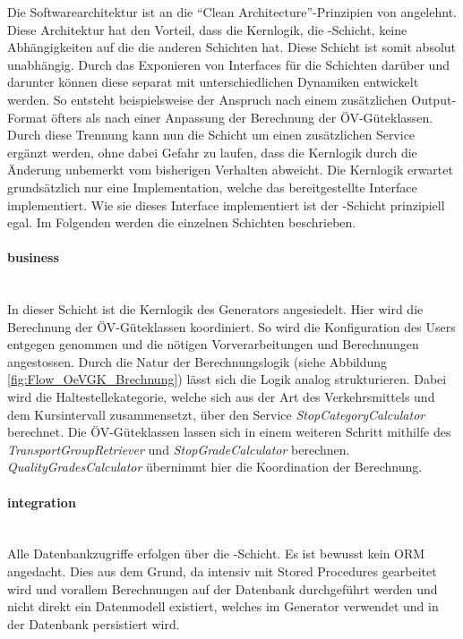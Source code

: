Die Softwarearchitektur ist an die "`Clean Architecture"'-Prinzipien von \cite{martin_clean_architecture} angelehnt.
Diese Architektur hat den Vorteil, dass die Kernlogik, die \emph{}-Schicht, keine Abhängigkeiten auf die die anderen Schichten hat.
Diese Schicht ist somit absolut unabhängig.
Durch das Exponieren von Interfaces für die Schichten darüber und darunter können diese separat mit unterschiedlichen Dynamiken entwickelt werden.
So entsteht beispielsweise der Anspruch nach einem zusätzlichen Output-Format öfters als nach einer Anpassung der Berechnung der \acs{ÖV}-Güteklassen.
Durch diese Trennung kann nun die Schicht  um einen zusätzlichen Service ergänzt werden, ohne dabei Gefahr zu laufen, dass die Kernlogik durch die Änderung unbemerkt vom bisherigen Verhalten abweicht.
Die Kernlogik erwartet grundsätzlich nur eine Implementation, welche das bereitgestellte Interface implementiert.
Wie sie dieses Interface implementiert ist der \emph{}-Schicht prinzipiell egal.
Im Folgenden werden die einzelnen Schichten beschrieben.

\paragraph{business}~\\
\label{layer:business}
In dieser Schicht ist die Kernlogik des Generators angesiedelt.
Hier wird die Berechnung der \acs{ÖV}-Güteklassen koordiniert.
So wird die Konfiguration des Users entgegen genommen und die nötigen Vorverarbeitungen und Berechnungen angestossen.
Durch die Natur der Berechnungslogik (siehe Abbildung \ref{fig:Flow_OeVGK_Brechnung}) lässt sich die Logik analog strukturieren.
Dabei wird die Haltestellekategorie, welche sich aus der Art des Verkehrsmittels und dem Kursintervall zusammensetzt, über den Service \emph{StopCategoryCalculator} berechnet.
Die \acs{ÖV}-Güteklassen lassen sich in einem weiteren Schritt mithilfe des \emph{TransportGroupRetriever} und \emph{StopGradeCalculator} berechnen.
\emph{QualityGradesCalculator} übernimmt hier die Koordination der Berechnung.

\paragraph{integration}~\\
\label{layer:integration}
Alle Datenbankzugriffe erfolgen über die \emph{}-Schicht.
Es ist bewusst kein \acl{ORM} angedacht.
Dies aus dem Grund, da intensiv mit \glspl{Stored Procedure} gearbeitet wird und vorallem Berechnungen auf der Datenbank durchgeführt werden und nicht direkt ein Datenmodell existiert, welches im Generator verwendet und in der Datenbank persistiert wird.

